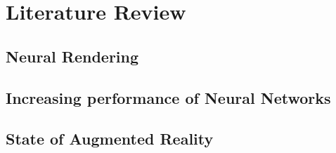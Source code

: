 \chapter{Literature Review}
\section{Neural Rendering}
\section{Increasing performance of Neural Networks}
\section{State of Augmented Reality}
